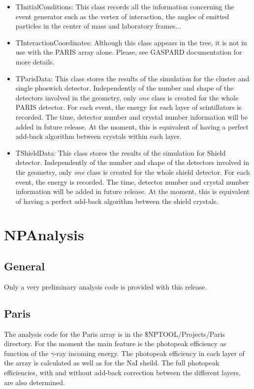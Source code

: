 \documentclass[a4paper,12pt]{article}
\begin{document}
\begin{itemize}
   \item {TInitialConditions:}
      This class records all the information concerning the event generator
      such as the vertex of interaction, the angles of emitted particles in 
      the center of mass and laboratory frames...

   \item {TInteractionCoordinates:}
      Although this class appears in the tree, it is not in use with the PARIS array alone. 
      Please, see GASPARD documentation for more details.

   \item {TParisData:}
      This class stores the results of the simulation for the cluster and single phoswich 
      detector. Independently of the number and shape of the detectors involved in the 
      geometry, only {\it one} class is created for the whole PARIS detector. For each event,
      the energy for each layer of scintillators is recorded. The time, detector number and 
      crystal number information will be added in future release. At the moment, this is 
      equivalent of having a perfect add-back algorithm between crystals within each layer.
      
   \item {TShieldData:}
      This class stores the results of the simulation for Shield detector. 
      Independently of the number and shape of the 
      detectors involved in the geometry, only {\it one} class is created for 
      the whole shield detector. For each event, the energy is recorded.
      The time, detector number and crystal number information will be added in future 
      release. At the moment, this is equivalent of having a perfect add-back algorithm 
      between the shield crystals.
\end{itemize}


\section{NPAnalysis}

\subsection{General}

Only a very preliminary analysis code is provided with this release. 

\subsection{Paris}
The analysis code for the Paris array is in the \$NPTOOL/Projects/Paris
directory. For the moment the main feature is the photopeak efficiency as function of the 
$\gamma$-ray incoming energy. The photopeak efficiency in each layer of the array is 
calculated as well as for the NaI sheild. The full photopeak efficiencies, with and without 
add-back correction between the different layers, are also determined. 
\end{document}

